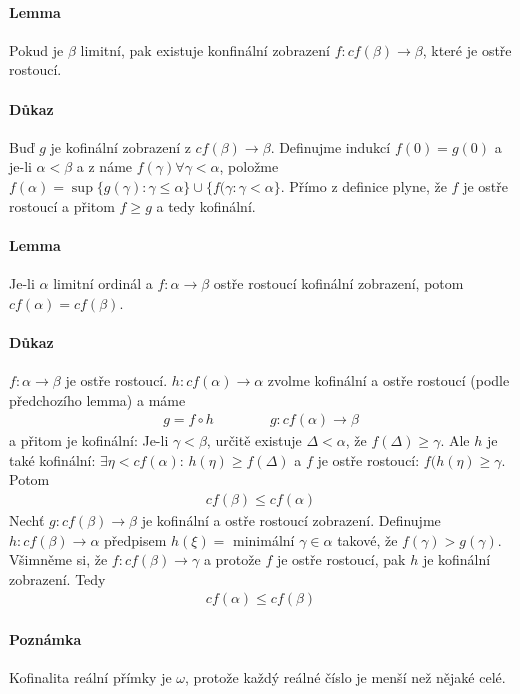 \documentclass[a4paper,12pt,titlepage]{article}
\begin{document}
\paragraph{Lemma}
Pokud je $\beta$ limitní, pak existuje konfinální zobrazení $f: cf(\beta) \to
\beta$, které je ostře rostoucí.
\paragraph{Důkaz}
Buď $g$ je kofinální zobrazení z $cf(\beta) \to \beta$. Definujme indukcí $f(0) =
g(0)$ a je-li $\alpha < \beta$ a z náme $f(\gamma) \forall \gamma < \alpha$,
položme $f(\alpha) = \sup\{g(\gamma) : \gamma \le \alpha \} \cup \{ f(\gamma:
\gamma < \alpha \}$. Přímo z definice plyne, že $f$ je ostře rostoucí a přitom $f
\ge g$ a tedy kofinální.
\paragraph{Lemma}
Je-li $\alpha$ limitní ordinál a $f : \alpha \to \beta$ ostře rostoucí kofinální
zobrazení, potom $cf(\alpha) = cf(\beta)$.
\paragraph{Důkaz}
$f: \alpha \to \beta$ je ostře rostoucí. $h: cf(\alpha) \to \alpha$ zvolme kofinální
a ostře rostoucí (podle předchozího lemma) a máme
\begin{align}
	g = f \circ h \qquad \qquad g: cf(\alpha) \to \beta
\end{align}
a přitom je kofinální: Je-li $\gamma < \beta$, určitě existuje $\Delta < \alpha$, že
$f(\Delta) \ge \gamma$. Ale $h$ je také kofinální: $\exists \eta < cf(\alpha)$:
$h(\eta) \ge f(\Delta)$ a $f$ je ostře rostoucí: $f(h(\eta) \ge \gamma$. Potom
\begin{align}
	cf(\beta) \le cf(\alpha)
\end{align}
Nechť $g: cf(\beta) \to \beta$ je kofinální a ostře rostoucí zobrazení.
Definujme $h: cf(\beta) \to \alpha$ předpisem $h(\xi) =$ minimální $\gamma \in
\alpha$ takové, že $f(\gamma) > g(\gamma)$. Všimněme si, že $f: cf(\beta) \to
\gamma$ a protože $f$ je ostře rostoucí, pak $h$ je kofinální zobrazení. Tedy 
\begin{align}
	cf(\alpha) \le cf(\beta)
\end{align}
\paragraph{Poznámka}
Kofinalita reální přímky je $\omega$, protože každý reálné číslo je menší než
nějaké celé.
\end{document}
